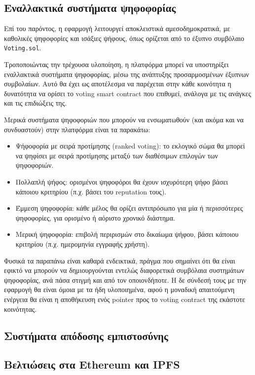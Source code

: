\subsection{Εναλλακτικά συστήματα ψηφοφορίας}\label{subsection:5-4-3-alternative-voting-systems}

Επί του παρόντος, η εφαρμογή λειτουργεί αποκλειστικά αμεσοδημοκρατικά, με καθολικές ψηφοφορίες και ισάξιες ψήφους, όπως ορίζεται από το έξυπνο συμβόλαιο \texttt{Voting.sol}. 

Τροποποιώντας την τρέχουσα υλοποίηση, η πλατφόρμα μπορεί να υποστηρίξει εναλλακτικά συστήματα ψηφοφορίας, μέσω της ανάπτυξης προσαρμοσμένων έξυπνων συμβολαίων. Αυτό θα έχει ως αποτέλεσμα να παρέχεται στην κάθε κοινότητα η δυνατότητα να ορίσει το voting smart contract που επιθυμεί, ανάλογα με τις ανάγκες και τις επιδιώξεις της.

Μερικά συστήματα ψηφοφοριών που μπορούν να ενσωματωθούν (και ακόμα και να συνδυαστούν) στην πλατφόρμα είναι τα παρακάτω:

\begin{itemize}
	\item Ψήφοφορία με σειρά προτίμησης (ranked voting): το εκλογικό σώμα θα μπορεί να ψηφίσει με σειρά προτίμησης μεταξύ των διαθέσιμων επιλογών των ψηφοφοριών.
	\item Πολλαπλή ψήφος: ορισμένοι ψηφοφόροι θα έχουν ισχυρότερη ψήφο βάσει κάποιου κριτηρίου (π.χ. βάσει του reputation τους).
	\item Έμμεση ψηφοφορία: κάθε μέλος θα ορίζει αντιπρόσωπο για μία ή περισσότερες ψηφοφορίες, για ορισμένο ή αόριστο χρονικό διάστημα.
	\item Μερική ψηφοφορία: επιβολή περιρισμών στο δικαίωμα ψήφου, βάσει κάποιου κριτηρίου (π.χ. ημερομηνία εγγραφής χρήστη).
\end{itemize}

Φυσικά τα παραπάνω είναι καθαρά ενδεικτικά, πράγμα που σημαίνει ότι θα είναι εφικτό να μπορούν να δημιουργούνται εντελώς διαφορετικά συμβόλαια συστημάτων ψηφοφορίας, ανά πάσα στιγμή και από τον οποιονδήποτε. Η δε σύνδεσή τους με την εφαρμογή θα είναι όμοια με τα ήδη υλοποιημένα, αφού η μοναδική απαιτούμενη ενέργεια θα είναι η αποθήκευση ενός pointer προς το voting contract της εκάστοτε κοινότητας.

\subsection{Συστήματα απόδοσης εμπιστοσύνης}\label{subsection:5-4-4-reputation-systems}

\subsection{Βελτιώσεις στα Ethereum και IPFS}\label{subsection:5-4-5-ethereum-ipfs-improvements}
